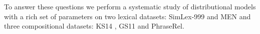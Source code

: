 \documentclass[11pt,letterpaper]{article}
\begin{document}
To answer these questions we perform a systematic study of distributional models with a rich set of parameters on two lexical datasets: SimLex-999 \cite{hill2014simlex} and MEN \cite{Bruni:2014:MDS:2655713.2655714} and three compositional datasets: KS14 \cite{kartsadrqpl2014}, GS11 \cite{Grefenstette:2011:ESC:2145432.2145580} and PhraseRel.


%

% 
\balance

\end{document}
